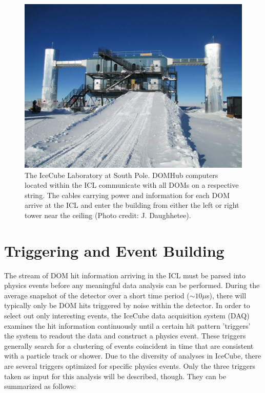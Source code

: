 \documentclass{gatech-thesis}
\begin{document}
\begin{figure}[ht]
  \begin{center}
    \includegraphics[width=1.0\textwidth,keepaspectratio]{ICL.jpg}
  \end{center}
  \caption{The IceCube Laboratory at South Pole. DOMHub computers located within the ICL communicate with all DOMs on a respective string. The cables carrying power and information for each DOM arrive at the ICL and enter the building from either the left or right tower near the ceiling (Photo credit: J. Daughhetee).}
  \label{fig:icl}
\end{figure}

\section{Triggering and Event Building}

The stream of DOM hit information arriving in the ICL must be parsed into physics events before any meaningful data analysis can be performed. During the average snapshot of the detector over a short time period ($\sim 10 \mu$s), there will typically only be DOM hits triggered by noise within the detector. In order to select out only interesting events, the IceCube data acquisition system (DAQ) examines the hit information continuously until a certain hit pattern 'triggers' the system to readout the data and construct a physics event. These triggers generally search for a clustering of events coincident in time that are consistent with a particle track or shower. Due to the diversity of analyses in IceCube, there are several triggers optimized for specific physics events. Only the three triggers taken as input for this analysis will be described, though. They can be summarized as follows:
\end{document}
